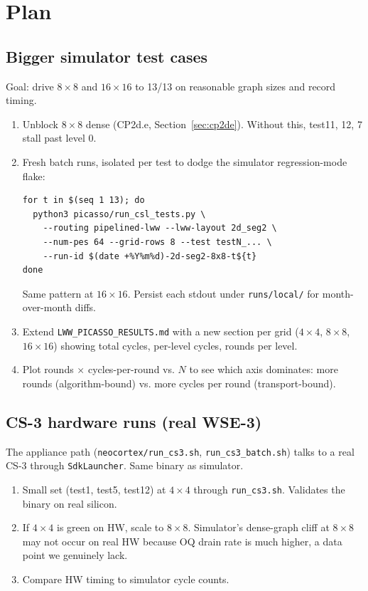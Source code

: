 \documentclass[11pt]{article}
\newcommand{\code}[1]{\texttt{#1}}
\newcommand{\file}[1]{\texttt{#1}}
\begin{document}
\section{Plan}

\subsection{Bigger simulator test cases}
Goal: drive $8\times 8$ and $16\times 16$ to 13/13 on reasonable
graph sizes and record timing.

\begin{enumerate}[leftmargin=1.3em,itemsep=0.2em]
  \item Unblock $8\times 8$ dense (CP2d.e,
    Section~\ref{sec:cp2de}). Without this, test11, 12, 7 stall
    past level 0.
  \item Fresh batch runs, isolated per test to dodge the
    simulator regression-mode flake:

\begin{lstlisting}
for t in $(seq 1 13); do
  python3 picasso/run_csl_tests.py \
    --routing pipelined-lww --lww-layout 2d_seg2 \
    --num-pes 64 --grid-rows 8 --test testN_... \
    --run-id $(date +%Y%m%d)-2d-seg2-8x8-t${t}
done
\end{lstlisting}

    Same pattern at $16\times 16$. Persist each stdout under
    \file{runs/local/} for month-over-month diffs.
  \item Extend \file{LWW\_PICASSO\_RESULTS.md} with a new section
    per grid ($4\times 4$, $8\times 8$, $16\times 16$) showing
    total cycles, per-level cycles, rounds per level.
  \item Plot rounds $\times$ cycles-per-round vs. $N$ to see
    which axis dominates: more rounds (algorithm-bound) vs. more
    cycles per round (transport-bound).
\end{enumerate}

\subsection{CS-3 hardware runs (real WSE-3)}
The appliance path (\file{neocortex/run\_cs3.sh},
\file{run\_cs3\_batch.sh}) talks to a real CS-3 through
\code{SdkLauncher}. Same binary as simulator.

\begin{enumerate}[leftmargin=1.3em,itemsep=0.2em]
  \item Small set (test1, test5, test12) at $4\times 4$ through
    \file{run\_cs3.sh}. Validates the binary on real silicon.
  \item If $4\times 4$ is green on HW, scale to $8\times 8$.
    Simulator's dense-graph cliff at $8\times 8$ may not occur on
    real HW because OQ drain rate is much higher, a data
    point we genuinely lack.
  \item Compare HW timing to simulator cycle counts.
\end{enumerate}
\end{document}
